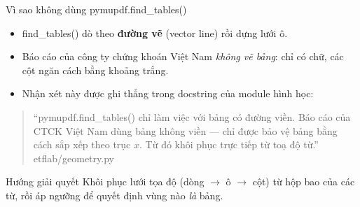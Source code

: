 \documentclass[aspectratio=169,11pt]{beamer}
\newcommand{\src}[1]{{\footnotesize\ttfamily #1}}
\begin{document}
\begin{frame}{Vì sao không dùng \src{pymupdf.find\_tables()}}
  \begin{itemize}
    \item \src{find\_tables()} dò theo \textbf{đường vẽ} (vector line) rồi dựng lưới ô.
    \item Báo cáo của công ty chứng khoán Việt Nam \emph{không vẽ bảng}: chỉ có
          chữ, các cột ngăn cách bằng khoảng trắng.
    \item Nhận xét này được ghi thẳng trong docstring của module hình học:
  \end{itemize}
  \begin{quotation}\small
    ``\src{pymupdf.find\_tables()} chỉ làm việc với bảng có đường viền. Báo cáo của
    CTCK Việt Nam dùng bảng không viền — chỉ được bảo vệ bảng bằng cách sắp xếp
    theo trục $x$. Từ đó khôi phục trực tiếp từ toạ độ từ.''
    \hfill\src{etflab/geometry.py}
  \end{quotation}
  \begin{block}{\small Hướng giải quyết}
    Khôi phục lưới tọa độ (dòng $\rightarrow$ ô $\rightarrow$ cột) từ hộp bao
    của các từ, rồi áp ngưỡng để quyết định vùng nào \emph{là} bảng.
  \end{block}
\end{frame}
\end{document}
